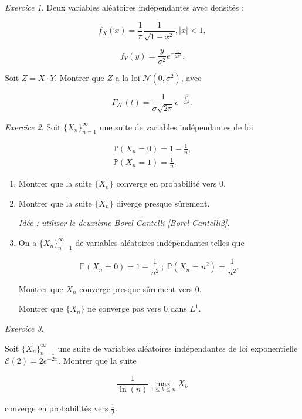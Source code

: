 \documentclass[french]{book}
\theoremstyle{definition}
\theoremstyle{remark}
\newtheorem{exo}{Exercice}
\newcommand{\lesss}{<}
\newcommand{\less}{\lesss}
\begin{document}
\begin{exo}
  Deux variables aléatoires indépendantes avec densités :

  \[f_X(x) = \frac{1}{\pi} \frac{1}{\sqrt{ 1- x ^2 }}, \left\lvert x \right\rvert \less 1,\]

  \[f_Y(y) = \frac{y}{\sigma ^2}e^{- \frac{y}{2 \sigma ^2}}.\]


  Soit \(Z = X \cdot Y\). Montrer que \(Z\) a la loi \(\mathscr{N}(0, \sigma^2)\), avec

  \[F _{\mathscr{N}}(t) = \frac{1}{\sigma \sqrt{ 2 \pi } } e^{-\frac{t ^2}{2 \sigma ^2}}.\]
\end{exo}

\begin{exo}
  Soit \(\{ X_n \}_{n=1}^{\infty}\) une suite de variables indépendantes de loi

  \begin{gather*}
    \mathbb{P}(X_n = 0) = 1 - \frac{1}{n}, \\
    \mathbb{P}(X_n = 1) = \frac{1}{n}.
  \end{gather*}

  \begin{enumerate}
    \item Montrer que la suite \(\{ X_n \}\) converge en probabilité vers 0.
    \item Montrer que la suite \(\{ X_n \}\) diverge presque sûrement.

    \emph{Idée : utiliser le deuxième Borel-Cantelli \ref{Borel-Cantelli2}.}

    \item On a \(\{ X_n \}_{n=1}^{\infty}\) de variables aléatoires indépendantes telles que

    \[\mathbb{P}(X_n=0) = 1 - \frac{1}{n ^2} \ ; \ \mathbb{P}(X_n = n ^2) = \frac{1}{n ^2}.\]

    Montrer que \(X_n\) converge presque sûrement vers 0.

    Montrer que \(\{ X_n \}\) ne converge pas vers 0 dans \(L ^{1}\).
  \end{enumerate}
\end{exo}

\begin{exo}
  \

  Soit \(\{ X_n \}_{n=1}^{\infty}\) une suite de variables aléatoires indépendantes de loi exponentielle \(\mathscr{E}(2) = 2 e^{- 2x}\). Montrer que la suite

  \[\frac{1}{\ln(n)} \max _{1 \leq k \leq n} X_k\]

  converge en probabilités vers \(\frac{1}{2}\).
\end{exo}
\end{document}

